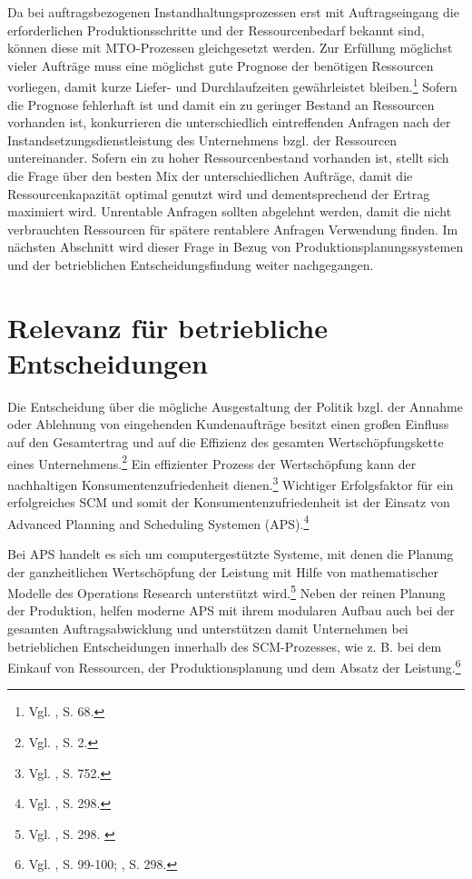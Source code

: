 Da bei auftragsbezogenen Instandhaltungsprozessen erst mit Auftragseingang die erforderlichen Produktionsschritte und der Ressourcenbedarf bekannt sind, können diese mit MTO-Prozessen gleichgesetzt werden. Zur Erfüllung möglichst vieler Aufträge muss eine möglichst gute Prognose der benötigen Ressourcen vorliegen, damit kurze Liefer- und Durchlaufzeiten gewährleistet bleiben.\footnote{Vgl. \cite{thaler2001supply}, S. 68.} Sofern die Prognose fehlerhaft ist und damit ein zu geringer Bestand an Ressourcen vorhanden ist, konkurrieren die unterschiedlich eintreffenden Anfragen nach der Instandsetzungsdienstleistung des Unternehmens bzgl. der Ressourcen untereinander. Sofern ein zu hoher Ressourcenbestand vorhanden ist, stellt sich die Frage über den besten Mix der unterschiedlichen Aufträge, damit die Ressourcenkapazität optimal genutzt wird und dementsprechend der Ertrag maximiert wird. Unrentable Anfragen sollten abgelehnt werden, damit die nicht verbrauchten Ressourcen für spätere rentablere Anfragen Verwendung finden. Im nächsten Abschnitt wird dieser Frage in Bezug von Produktionsplanungssystemen und der betrieblichen Entscheidungsfindung weiter nachgegangen.


\section{Relevanz für betriebliche Entscheidungen}

Die Entscheidung über die mögliche Ausgestaltung der Politik bzgl. der Annahme oder Ablehnung von eingehenden Kundenaufträge besitzt einen großen Einfluss auf den Gesamtertrag und auf die Effizienz des gesamten Wertschöpfungskette eines Unternehmens.\footnote{Vgl. \cite{talluri2004theory}, S. 2.} Ein effizienter Prozess der Wertschöpfung kann der nachhaltigen Konsumentenzufriedenheit dienen.\footnote{Vgl. \cite{Heikkila2002747}, S. 752.} Wichtiger Erfolgsfaktor für ein erfolgreiches SCM und somit der Konsumentenzufriedenheit ist der Einsatz von Advanced Planning and Scheduling Systemen (APS).\footnote{Vgl. \cite{fleischmeyr2004codp}, S. 298.}

Bei APS handelt es sich um computergestützte Systeme, mit denen die Planung der ganzheitlichen Wertschöpfung der Leistung mit Hilfe von mathematischer Modelle des Operations Research unterstützt wird.\footnote{Vgl. \cite{fleischmeyr2004codp}, S. 298. \label{fleisch}} Neben der reinen Planung der Produktion, helfen moderne APS mit ihrem modularen Aufbau auch bei der gesamten Auftragsabwicklung und unterstützen damit Unternehmen bei betrieblichen Entscheidungen innerhalb des SCM-Prozesses, wie z. B. bei dem Einkauf von Ressourcen, der Produktionsplanung und dem Absatz der Leistung.\footnote{Vgl. \cite{meyr2015structure}, S. 99-100; \cite{fleischmeyr2004codp}, S. 298.}

